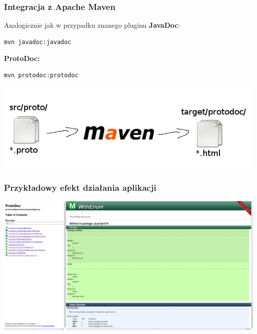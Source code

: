 \documentclass{beamer}
\begin{document}


\begin{frame}[fragile]
\frametitle{Integracja z Apache Maven}
Analogicznie jak w przypadku znanego pluginu \textbf{JavaDoc}:

\begin{lstlisting}
mvn javadoc:javadoc
\end{lstlisting}

\textbf{ProtoDoc:}
\begin{lstlisting}
mvn protodoc:protodoc
\end{lstlisting}

\begin{center}
 \includegraphics[scale = 0.40]{maven_files_flow}
\end{center}

\end{frame}



\begin{frame}
\frametitle{Przykładowy efekt działania aplikacji}
\begin{center}
 \includegraphics[width = \textwidth]{protodoc_msg}
\end{center}
\end{frame}
\end{document}
